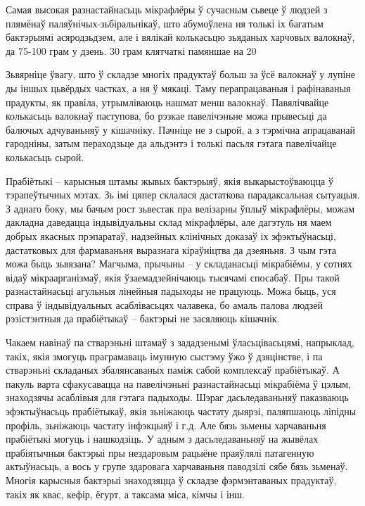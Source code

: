 Самая высокая разнастайнасьць мікрафлёры ў сучасным сьвеце ў людзей з плямёнаў паляўнічых-зьбіральнікаў, што абумоўлена ня толькі іх багатым бактэрыямі асяродзьдзем, але і вялікай колькасьцю зьяданых харчовых валокнаў, да 75-100 грам у дзень. 30 грам клятчаткі памяншае на 20%

Зьвярніце ўвагу, што ў складзе многіх прадуктаў больш за ўсё валокнаў у лупіне ды іншых цьвёрдых частках, а ня ў мякаці. Таму перапрацаваныя і рафінаваныя прадукты, як правіла, утрымліваюць нашмат менш валокнаў. Павялічвайце колькасьць валокнаў паступова, бо рэзкае павелічэньне можа прывесьці да балючых адчуваньняў у кішачніку. Пачніце не з сырой, а з тэрмічна апрацаванай гародніны, затым пераходзьце да альдэнтэ і толькі пасьля гэтага павелічайце колькасьць сырой.

Прабіётыкі – карысныя штамы жывых бактэрыяў, якія выкарыстоўваюцца ў тэрапеўтычных мэтах. Зь імі цяпер склалася дастаткова парадаксальная сытуацыя. З аднаго боку, мы бачым рост зьвестак пра велізарны ўплыў мікрафлёры, можам дакладна даведацца індывідуальны склад мікрафлёры, але дагэтуль ня маем добрых якасных прэпаратаў, надзейных клінічных доказаў іх эфэктыўнасьці, дастатковых для фармаваньня выразнага кіраўніцтва да дзеяньня. З чым гэта можа быць зьвязана? Магчыма, прычыны – у складанасьці мікрабіёмы, у сотнях відаў мікраарганізмаў, якія ўзаемадзейнічаюць тысячамі спосабаў. Пры такой разнастайнасьці агульныя лінейныя падыходы не працуюць. Можа быць, уся справа ў індывідуальных асаблівасьцях чалавека, бо амаль палова людзей рэзістэнтныя да прабіётыкаў – бактэрыі не засяляюць кішачнік.

Чакаем навінаў па стварэньні штамаў з зададзенымі ўласьцівасьцямі, напрыклад, такіх, якія змогуць праграмаваць імунную сыстэму ўжо ў дзяцінстве, і па стварэньні складаных збалянсаваных паміж сабой комплексаў прабіётыкаў. А пакуль варта сфакусавацца на павелічэньні разнастайнасьці мікрабіёма ў цэлым, знаходзячы асаблівыя для гэтага падыходы. Шэраг дасьледаваньняў паказваюць эфэктыўнасьць прабіётыкаў, якія зьніжаюць частату дыярэі, паляпшаюць ліпідны профіль, зьніжаюць частату інфэкцыяў і г.д. Але бязь зьмены харчаваньня прабіётыкі могуць і нашкодзіць. У адным з дасьледаваньняў на жывёлах прабіятычныя бактэрыі пры нездаровым рацыёне праяўлялі патагенную актыўнасьць, а вось у групе здаровага харчаваньня паводзілі сябе бязь зьменаў. Многія карысныя бактэрыі знаходзяцца ў складзе фэрмэнтаваных прадуктаў, такіх як квас, кефір, ёгурт, а таксама міса, кімчы і інш.

